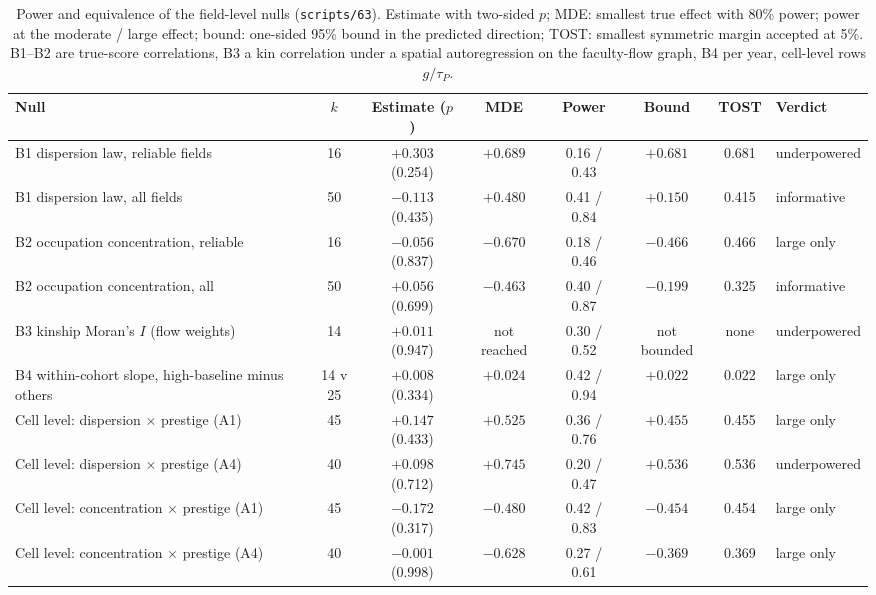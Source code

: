 \documentclass[11pt]{article}
\newcommand{\scr}[1]{\texttt{scripts/#1}}
\begin{document}
\begin{table}[!tbp]
\centering
\caption{Power and equivalence of the field-level nulls (\scr{63}). Estimate with two-sided $p$; MDE: smallest true effect with 80\%
power; power at the moderate / large effect; bound: one-sided 95\% bound in the predicted direction; TOST: smallest symmetric margin
accepted at 5\%. B1--B2 are true-score correlations, B3 a kin correlation under a spatial autoregression on the faculty-flow graph, B4
per year, cell-level rows $g/\tau_P$.}\label{tab:power}
\scriptsize
\setlength{\tabcolsep}{4pt}
\begin{tabular}{@{}>{\raggedright\arraybackslash}p{4.2cm}ccccccl@{}}
\toprule
Null & $k$ & Estimate ($p$) & MDE & Power & Bound & TOST & Verdict \\
\midrule
B1 dispersion law, reliable fields & 16 & $+0.303$ (0.254) & $+0.689$ & 0.16 / 0.43 & $+0.681$ & 0.681 & underpowered \\
B1 dispersion law, all fields & 50 & $-0.113$ (0.435) & $+0.480$ & 0.41 / 0.84 & $+0.150$ & 0.415 & informative \\
B2 occupation concentration, reliable & 16 & $-0.056$ (0.837) & $-0.670$ & 0.18 / 0.46 & $-0.466$ & 0.466 & large only \\
B2 occupation concentration, all & 50 & $+0.056$ (0.699) & $-0.463$ & 0.40 / 0.87 & $-0.199$ & 0.325 & informative \\
B3 kinship Moran's $I$ (flow weights) & 14 & $+0.011$ (0.947) & not reached & 0.30 / 0.52 & not bounded & none & underpowered \\
B4 within-cohort slope, high-baseline minus others & 14 v 25 & $+0.008$ (0.334) & $+0.024$ & 0.42 / 0.94 & $+0.022$ & 0.022 & large only \\
Cell level: dispersion $\times$ prestige (A1) & 45 & $+0.147$ (0.433) & $+0.525$ & 0.36 / 0.76 & $+0.455$ & 0.455 & large only \\
Cell level: dispersion $\times$ prestige (A4) & 40 & $+0.098$ (0.712) & $+0.745$ & 0.20 / 0.47 & $+0.536$ & 0.536 & underpowered \\
Cell level: concentration $\times$ prestige (A1) & 45 & $-0.172$ (0.317) & $-0.480$ & 0.42 / 0.83 & $-0.454$ & 0.454 & large only \\
Cell level: concentration $\times$ prestige (A4) & 40 & $-0.001$ (0.998) & $-0.628$ & 0.27 / 0.61 & $-0.369$ & 0.369 & large only \\
\bottomrule
\end{tabular}
\end{table}
\end{document}
